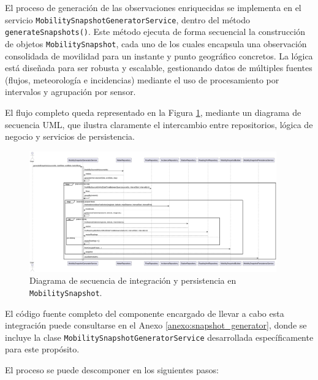 El proceso de generación de las observaciones enriquecidas se implementa en el servicio \texttt{MobilitySnapshotGeneratorService}, dentro del método \texttt{generateSnapshots()}. Este método ejecuta de forma secuencial la construcción de objetos \texttt{MobilitySnapshot}, cada uno de los cuales encapsula una observación consolidada de movilidad para un instante y punto geográfico concretos. La lógica está diseñada para ser robusta y escalable, gestionando datos de múltiples fuentes (flujos, meteorología e incidencias) mediante el uso de procesamiento por intervalos y agrupación por sensor.

El flujo completo queda representado en la Figura \ref{fig:sequence_mobility_snapshot}, mediante un diagrama de secuencia UML, que ilustra claramente el intercambio entre repositorios, lógica de negocio y servicios de persistencia.

\begin{figure}[H]
	\centering
	\includegraphics[width=0.95\textwidth]{includes/snapshot_generator_sequence.png}
	\caption{Diagrama de secuencia de integración y persistencia en \texttt{MobilitySnapshot}.}
	\label{fig:sequence_mobility_snapshot}
\end{figure}

El código fuente completo del componente encargado de llevar a cabo esta integración puede consultarse en el Anexo \ref{anexo:snapshot_generator}, donde se incluye la clase \texttt{MobilitySnapshotGeneratorService} desarrollada específicamente para este propósito.

El proceso se puede descomponer en los siguientes pasos:

